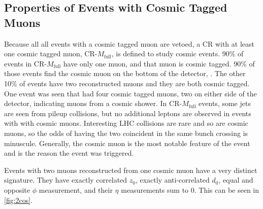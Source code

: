 


\subsection{Properties of Events with Cosmic Tagged Muons}
Because all all events with a cosmic tagged muon are vetoed, a \ac{CR} with at least one cosmic tagged muon, CR-$M_{\textrm{full}}$, is defined to study cosmic events. 90\% of events in CR-$M_{\textrm{full}}$ have only one muon, and that muon is cosmic tagged. 90\% of those events find the cosmic muon on the bottom of the detector, \mb. The other 10\% of events have two reconstructed muons and they are both cosmic tagged. One event was seen that had four cosmic tagged muons, two on either side of the detector, indicating muons from a cosmic shower. In CR-$M_{\textrm{full}}$ events, some jets are seen from pileup collisions, but no additional leptons are observed in events with with cosmic muons. Interesting \ac{LHC} collisions are rare and so are cosmic muons, so the odds of having the two coincident in the same bunch crossing is minuscule. Generally, the cosmic muon is the most notable feature of the event and is the reason the event was triggered.

Events with two muons reconstructed from one cosmic muon have a very distinct signature. They have exactly correlated $z_{0}$, exactly anti-correlated $d_{0}$, equal and opposite $\phi$ measurement, and their $\eta$ measurements sum to 0. This can be seen in \autoref{fig:2cos}.

